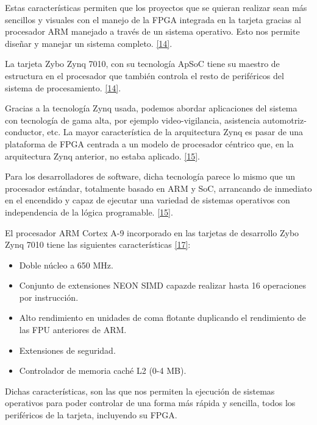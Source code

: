 Estas características permiten que los proyectos que se quieran realizar sean más sencillos y visuales con el manejo de la FPGA integrada en la tarjeta gracias al procesador ARM manejado a través de un sistema operativo. Esto nos permite diseñar y manejar un sistema completo. \hyperlink{14}{[14]}.

La tarjeta Zybo Zynq 7010, con su tecnología ApSoC tiene su maestro de estructura en el procesador que también controla el resto de periféricos del sistema de procesamiento. \hyperlink{14}{[14]}.



Gracias a la tecnología Zynq usada, podemos abordar aplicaciones del sistema con tecnología de gama alta, por ejemplo video-vigilancia, asistencia automotriz-conductor, etc. La mayor característica de la arquitectura Zynq es pasar de una plataforma de FPGA centrada a un modelo de procesador céntrico que, en la arquitectura Zynq anterior, no estaba aplicado. \hyperlink{15}{[15]}.

Para los desarrolladores de software, dicha tecnología parece lo mismo que un procesador estándar, totalmente basado en ARM y SoC, arrancando de inmediato en el encendido y capaz de ejecutar una variedad de sistemas operativos con independencia de la lógica programable. \hyperlink{15}{[15]}.

El procesador ARM Cortex A-9 incorporado en las tarjetas de desarrollo Zybo Zynq 7010 tiene las siguientes características \hyperlink{17}{[17]}:
\begin{itemize}
	\item Doble núcleo a 650 MHz.
	\item Conjunto de extensiones NEON SIMD capazde realizar hasta 16 operaciones por instrucción.
	\item Alto rendimiento en unidades de coma flotante duplicando el rendimiento de las FPU anteriores de ARM.
	\item Extensiones de seguridad.
	\item Controlador de memoria caché L2 (0-4 MB).
\end{itemize}

Dichas características, son las que nos permiten la ejecución de sistemas operativos para poder controlar de una forma más rápida y sencilla, todos los periféricos de la tarjeta, incluyendo su FPGA.